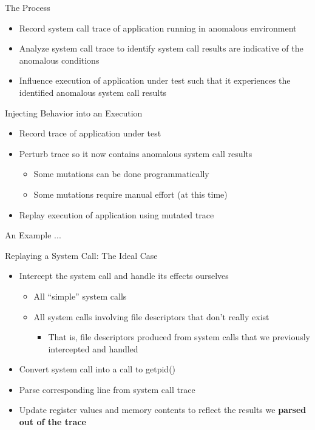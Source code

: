 \documentclass[pdf]{beamer}
\begin{document}
\begin{frame}{The Process}
  \begin{itemize}
  \item{Record system call trace of application running in anomalous
      environment}
  \item{Analyze system call trace to identify system call results are
      indicative of the anomalous conditions}
  \item{Influence execution of application under test such that it experiences
      the identified anomalous system call results}
  \end{itemize}
\end{frame}


\begin{frame}{Injecting Behavior into an Execution}
  \begin{itemize}
  \item{Record trace of application under test}
  \item{Perturb trace so it now contains anomalous system call results}
    \begin{itemize}
    \item{Some mutations can be done programmatically}
    \item{Some mutations require manual effort (at this time)}
    \end{itemize}
  \item{Replay execution of application using mutated trace}
  \end{itemize}
\end{frame}


\begin{frame}{An Example}
  ...
\end{frame}


\begin{frame}{Replaying a System Call: The Ideal Case}
  \begin{itemize}
  \item{Intercept the system call and handle its effects
      ourselves}
    \begin{itemize}
    \item{All ``simple'' system calls}
    \item{All system calls involving file descriptors that don't really exist}
      \begin{itemize}
      \item{That is, file descriptors produced from system calls that we
          previously intercepted and handled}
      \end{itemize}
    \end{itemize}
  \item{Convert system call into a call to getpid()}
  \item{Parse corresponding line from system call trace}
  \item{Update register values and memory contents to reflect the results we
      \textbf{parsed out of the trace}}
  \end{itemize}
\end{frame}
\end{document}
